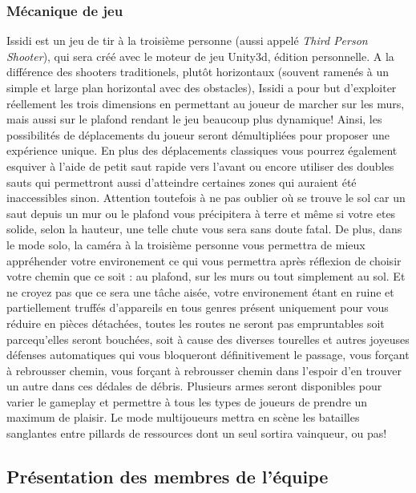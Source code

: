 ﻿\documentclass[12pt]{article}
\begin{document}
\subsubsection{Mécanique de jeu}
Issidi est un jeu de tir à la troisième personne (aussi appelé
\emph{Third Person Shooter}), qui sera créé avec le moteur de jeu
Unity3d, édition personnelle. A la différence des shooters
traditionels, plutôt horizontaux (souvent ramenés à un simple et
large plan horizontal avec des obstacles), Issidi a pour but
d’exploiter réellement les trois dimensions en permettant au
joueur de marcher sur les murs, mais aussi sur le plafond rendant
le jeu beaucoup plus dynamique! Ainsi, les possibilités de
déplacements du joueur seront démultipliées pour proposer une
expérience unique. En plus des déplacements classiques vous
pourrez également esquiver à l’aide de petit saut rapide vers
l’avant ou encore utiliser des doubles sauts qui permettront
aussi d’atteindre certaines zones qui auraient été inaccessibles
sinon. Attention toutefois à ne pas oublier où se trouve le sol
car un saut depuis un mur ou le plafond vous précipitera à terre
et même si votre etes solide, selon la hauteur, une telle chute
vous sera sans doute fatal. De plus, dans le mode solo, la caméra
à la troisième personne vous permettra de mieux appréhender votre
environement ce qui vous permettra après réﬂexion de choisir votre
chemin que ce soit : au plafond, sur les murs ou tout simplement
au sol. Et ne croyez pas que ce sera une tâche aisée, votre
environement étant en ruine et partiellement truffés d’appareils
en tous genres présent uniquement pour vous réduire en pièces
détachées, toutes les routes ne seront pas empruntables soit
parcequ’elles seront bouchées, soit à cause des diverses tourelles
et autres joyeuses défenses automatiques qui vous bloqueront
déﬁnitivement le passage, vous forçant à rebrousser chemin, vous
forçant à rebrousser chemin dans l’espoir d’en trouver un autre
dans ces dédales de débris. Plusieurs armes seront disponibles
pour varier le gameplay et permettre à tous les types de joueurs
de prendre un maximum de plaisir. Le mode multijoueurs mettra en
scène les batailles sanglantes entre pillards de ressources dont
un seul sortira vainqueur, ou pas!



\subsection{Présentation des membres de l'équipe}
\end{document}
